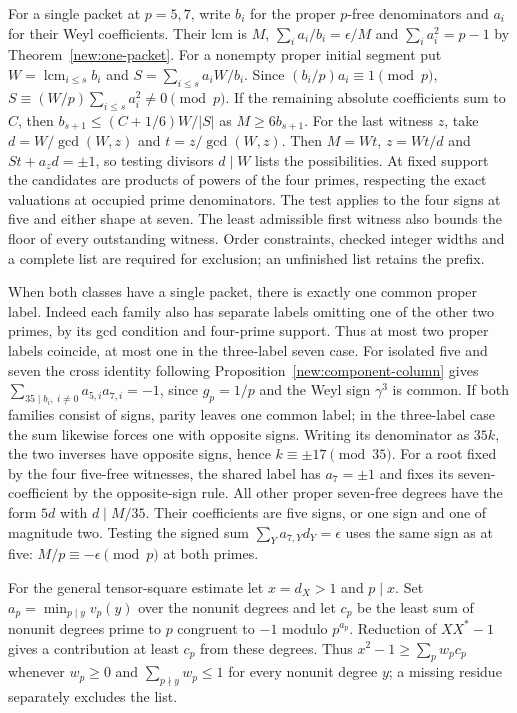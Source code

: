 \documentclass[11pt]{amsart}
\numberwithin{equation}{section}
\theoremstyle{definition}
\theoremstyle{plain}
\DeclareMathOperator{\lcm}{lcm}
\begin{document}
For a single packet at $p=5,7$, write $b_i$ for the proper $p$-free
denominators and $a_i$ for their Weyl coefficients. Their lcm is $M$,
$\sum_i a_i/b_i=\epsilon/M$ and $\sum_i a_i^2=p-1$ by
Theorem~\ref{new:one-packet}. For a nonempty proper initial segment
put $W=\lcm_{i\le s}b_i$ and $S=\sum_{i\le s}a_iW/b_i$.
Since $(b_i/p)a_i\equiv1\pmod p$,
$S\equiv (W/p)\sum_{i\le s}a_i^2\ne0\pmod p$.
If the remaining absolute coefficients sum to $C$, then
$b_{s+1}\le(C+1/6)W/|S|$ as $M\ge6b_{s+1}$.
For the last witness $z$, take $d=W/\gcd(W,z)$ and $t=z/\gcd(W,z)$.
Then $M=Wt$, $z=Wt/d$ and $St+a_zd=\pm1$, so testing divisors
$d\mid W$ lists the possibilities. At fixed support the candidates are products of powers of the four primes, respecting the exact valuations at occupied prime denominators. The test applies to the four signs at five and either shape at seven. The least admissible first witness also bounds the floor of every outstanding witness. Order constraints, checked integer widths and a complete list are required for exclusion; an unfinished list retains the prefix.

When both classes have a single packet, there is exactly one common
proper label. Indeed each family also has separate labels omitting
one of the other two primes, by its gcd condition and four-prime
support. Thus at most two proper labels coincide, at most one in
the three-label seven case. For isolated five and seven the cross
identity following Proposition~\ref{new:component-column} gives
$\sum_{35\mid b_i,\ i\ne0}a_{5,i}a_{7,i}=-1$, since $g_p=1/p$
and the Weyl sign $\gamma^3$ is common. If both families consist of
signs, parity leaves one common label; in the three-label case the
sum likewise forces one with opposite signs. Writing its denominator
as $35k$, the two inverses have opposite signs, hence $k\equiv\pm17\pmod{35}$.
For a root fixed by the four five-free witnesses, the shared label has $a_7=\pm1$ and fixes its seven-coefficient by the opposite-sign rule. All other proper seven-free degrees have the form $5d$ with $d\mid M/35$. Their coefficients are five signs, or one sign and one of magnitude two. Testing the signed sum $\sum_Ya_{7,Y}d_Y=\epsilon$ uses the same sign as at five: $M/p\equiv-\epsilon\pmod p$ at both primes.

For the general tensor-square estimate let $x=d_X>1$ and $p\mid x$.
Set $a_p=\min_{p\mid y}v_p(y)$ over the nonunit degrees and let $c_p$
be the least sum of nonunit degrees prime to $p$ congruent to $-1$
modulo $p^{a_p}$. Reduction of $XX^*-1$ gives a contribution at least
$c_p$ from these degrees. Thus $x^2-1\ge\sum_p w_pc_p$ whenever
$w_p\ge0$ and $\sum_{p\nmid y}w_p\le1$ for every nonunit degree $y$;
a missing residue separately excludes the list.
\end{document}
